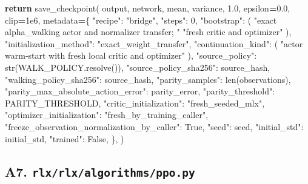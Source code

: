 \documentclass[
  american,
  11pt,
  letterpaper,
]{article}
\newenvironment{Shaded}{\begin{snugshade}}{\end{snugshade}}
\newcommand{\BuiltInTok}[1]{#1}
\newcommand{\ControlFlowTok}[1]{\textcolor[rgb]{0.13,0.29,0.53}{\textbf{#1}}}
\newcommand{\DecValTok}[1]{\textcolor[rgb]{0.00,0.00,0.81}{#1}}
\newcommand{\FloatTok}[1]{\textcolor[rgb]{0.00,0.00,0.81}{#1}}
\newcommand{\NormalTok}[1]{#1}
\newcommand{\OperatorTok}[1]{\textcolor[rgb]{0.81,0.36,0.00}{\textbf{#1}}}
\newcommand{\StringTok}[1]{\textcolor[rgb]{0.31,0.60,0.02}{#1}}
\newcommand{\VariableTok}[1]{\textcolor[rgb]{0.00,0.00,0.00}{#1}}
\renewenvironment{Shaded}{\par\smallskip}{\par\smallskip}
\begin{document}
\begin{Shaded}
\begin{Highlighting}[]
    \ControlFlowTok{return}\NormalTok{ save\_checkpoint(}
\NormalTok{        output,}
\NormalTok{        network,}
\NormalTok{        mean,}
\NormalTok{        variance,}
        \FloatTok{1.0}\NormalTok{,}
\NormalTok{        epsilon}\OperatorTok{=}\FloatTok{0.0}\NormalTok{,}
\NormalTok{        clip}\OperatorTok{=}\FloatTok{1e6}\NormalTok{,}
\NormalTok{        metadata}\OperatorTok{=}\NormalTok{\{}
            \StringTok{"recipe"}\NormalTok{: }\StringTok{"bridge"}\NormalTok{,}
            \StringTok{"steps"}\NormalTok{: }\DecValTok{0}\NormalTok{,}
            \StringTok{"bootstrap"}\NormalTok{: (}
                \StringTok{"exact alpha\_walking actor and normalizer transfer; "}
                \StringTok{"fresh critic and optimizer"}
\NormalTok{            ),}
            \StringTok{"initialization\_method"}\NormalTok{: }\StringTok{"exact\_weight\_transfer"}\NormalTok{,}
            \StringTok{"continuation\_kind"}\NormalTok{: (}
                \StringTok{"actor warm{-}start with fresh local critic and optimizer"}
\NormalTok{            ),}
            \StringTok{"source\_policy"}\NormalTok{: }\BuiltInTok{str}\NormalTok{(WALK\_POLICY.resolve()),}
            \StringTok{"source\_policy\_sha256"}\NormalTok{: source\_hash,}
            \StringTok{"walking\_policy\_sha256"}\NormalTok{: source\_hash,}
            \StringTok{"parity\_samples"}\NormalTok{: }\BuiltInTok{len}\NormalTok{(observations),}
            \StringTok{"parity\_max\_absolute\_action\_error"}\NormalTok{: parity\_error,}
            \StringTok{"parity\_threshold"}\NormalTok{: PARITY\_THRESHOLD,}
            \StringTok{"critic\_initialization"}\NormalTok{: }\StringTok{"fresh\_seeded\_mlx"}\NormalTok{,}
            \StringTok{"optimizer\_initialization"}\NormalTok{: }\StringTok{"fresh\_by\_training\_caller"}\NormalTok{,}
            \StringTok{"freeze\_observation\_normalization\_by\_caller"}\NormalTok{: }\VariableTok{True}\NormalTok{,}
            \StringTok{"seed"}\NormalTok{: seed,}
            \StringTok{"initial\_std"}\NormalTok{: initial\_std,}
            \StringTok{"trained"}\NormalTok{: }\VariableTok{False}\NormalTok{,}
\NormalTok{        \},}
\NormalTok{    )}
\end{Highlighting}
\end{Shaded}

\subsection{\texorpdfstring{A7.
\texttt{rlx/\allowbreak{}rlx/\allowbreak{}algorith\allowbreak{}ms/\allowbreak{}ppo.py}}{A7. }}\label{a7.-rlxrlxalgorithmsppo.py}
\end{document}
